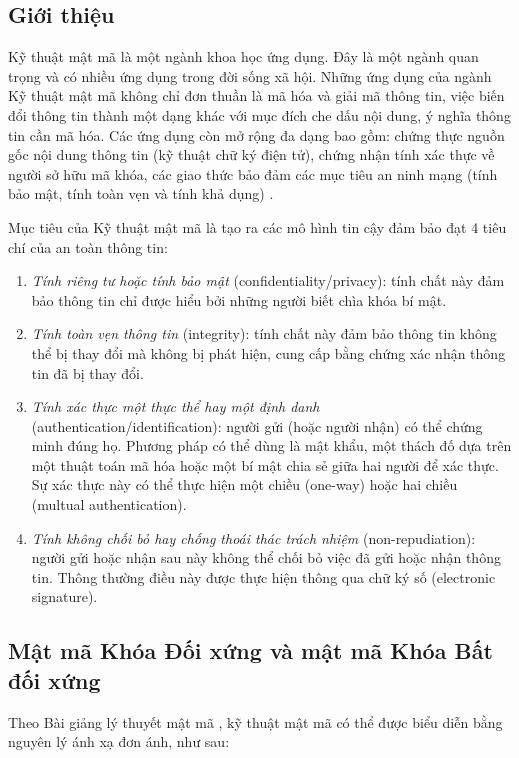 \subsection{Giới thiệu}
Kỹ thuật mật mã là một ngành khoa học ứng dụng. 
Đây là một ngành quan trọng và có nhiều ứng dụng trong đời sống xã hội. 
Những ứng dụng của ngành Kỹ thuật mật mã không chỉ đơn thuần là mã hóa và giải mã thông tin, việc biến đổi thông tin thành một dạng khác với mục đích che dấu nội dung, ý nghĩa thông tin cần mã hóa. 
Các ứng dụng còn mở rộng đa dạng bao gồm: chứng thực nguồn gốc nội dung thông tin (kỹ thuật chữ ký điện tử), chứng nhận tính xác thực về người sở hữu mã khóa, các giao thức bảo đảm các mục tiêu an ninh mạng (tính bảo mật, tính toàn vẹn và tính khả dụng) \cite{dothanhnghi2018}.

Mục tiêu của Kỹ thuật mật mã là tạo ra các mô hình tin cậy đảm bảo đạt 4 tiêu chí của an toàn thông tin:

\begin{enumerate}

\item  \emph{Tính riêng tư hoặc tính bảo mật} (confidentiality/privacy): tính chất này đảm bảo thông tin chỉ được hiểu bởi những người biết chìa khóa bí mật.
\item \emph{Tính toàn vẹn thông tin} (integrity): tính chất này đảm bảo thông tin không thể bị thay đổi mà không bị phát hiện, cung cấp bằng chứng xác nhận thông tin đã bị thay đổi.
\item \emph{Tính xác thực một thực thể hay một định danh} (authentication/identification): người gửi (hoặc người nhận) có thể chứng minh đúng họ. Phương pháp có thể dùng là mật khẩu, một thách đố dựa trên một thuật toán mã hóa hoặc một bí mật chia sẻ giữa hai người để xác thực. Sự xác thực này có thể thực hiện một chiều (one-way) hoặc hai chiều (multual authentication).
\item \emph{Tính không chối bỏ hay chống thoái thác trách nhiệm} (non-repudiation): người gửi hoặc nhận sau này không thể chối bỏ việc đã gửi hoặc nhận thông tin. Thông thường điều này được thực hiện thông qua chữ ký số (electronic signature).

\end{enumerate}

\subsection{Mật mã Khóa Đối xứng và mật mã Khóa Bất đối xứng}

Theo Bài giảng lý thuyết mật mã \cite{lequyetthang2016}, kỹ thuật mật mã có thể được biểu diễn bằng nguyên lý ánh xạ đơn ánh, như sau:


